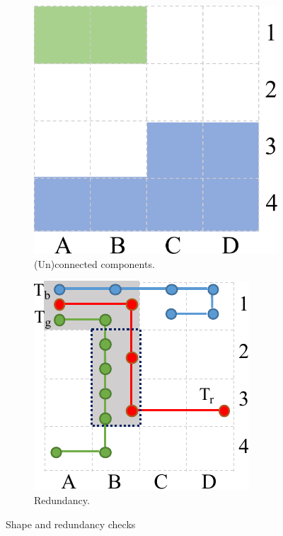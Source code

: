 \documentclass[preprint,12pt,authoryear]{elsarticle} %
\begin{document}
\begin{figure}[t]
\begin{subfigure}{.48\columnwidth}
    \centering
    \includegraphics[scale=.18]{pruning.pdf}
    \caption{(Un)connected components.}
    \label{fig:conncomp}
\end{subfigure}
\begin{subfigure}{.48\columnwidth}
    \centering
    \includegraphics[scale=.6]{theorem.pdf}
    \caption{Redundancy.}
    \label{fig:theorem}
\end{subfigure}
\caption{Shape and redundancy checks}
\end{figure}
\end{document}
